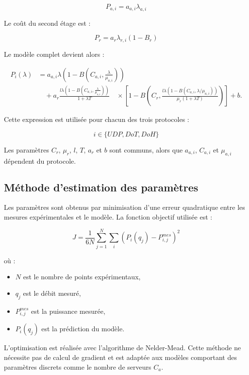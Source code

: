 \documentclass[12pt, a4paper]{report}
\begin{document}
	\[
	P_{a,i}=a_{a,i}\lambda_{a,i}
	\]

	\noindent Le coût du second étage est :


	\[
	P_r=
	a_r\lambda_{r,i}(1-B_r)
	\]


	\noindent Le modèle complet devient alors :


	\begin{align}
	P_i(\lambda)
	&=
	a_{a,i}\lambda
	\left(
	1-
	B\left(C_{a,i},\frac{\lambda}{\mu_{a,i}}\right)
	\right)
	\nonumber\\
	&\quad+
	a_r
	\frac{
	l\lambda
	\left(
	1-
	B\left(C_{a,i},\frac{\lambda}{\mu_{a,i}}\right)
	\right)
	}
	{1+\lambda T}
	\quad\times
	\left[
	1-
	B\left(
	C_r,
	\frac{
	l\lambda
	(1-B(C_{a,i},\lambda/\mu_{a,i}))
	}
	{\mu_r(1+\lambda T)}
	\right)
	\right]
	+b .
	\end{align}



	\noindent Cette expression est utilisée pour chacun des trois protocoles :

	\[
	i\in\{UDP,DoT,DoH\}
	\]


	\noindent Les paramètres $C_r$, $\mu_r$, $l$, $T$, $a_r$ et $b$ sont communs,
	alors que $a_{a,i}$, $C_{a,i}$ et $\mu_{a,i}$ dépendent du protocole.




	\subsection{Méthode d'estimation des paramètres}


	\noindent Les paramètres sont obtenus par minimisation d'une erreur quadratique
	entre les mesures expérimentales et le modèle.
	La fonction objectif utilisée est :


	\[
	J=
	\frac1{6N}
	\sum_{j=1}^{N}
	\sum_i
	\left(
	P_i(q_j)-P_{i,j}^{mes}
	\right)^2
	\]


	où :\\

	\begin{itemize}
	\item $N$ est le nombre de points expérimentaux,
	\item $q_j$ est le débit mesuré,
	\item $P_{i,j}^{mes}$ est la puissance mesurée,
	\item $P_i(q_j)$ est la prédiction du modèle.\\
	\end{itemize}


	\noindent L'optimisation est réalisée avec l'algorithme de Nelder-Mead.
	Cette méthode ne nécessite pas de calcul de gradient et est adaptée
	aux modèles comportant des paramètres discrets comme le nombre de
	serveurs $C_a$.\\
\end{document}
